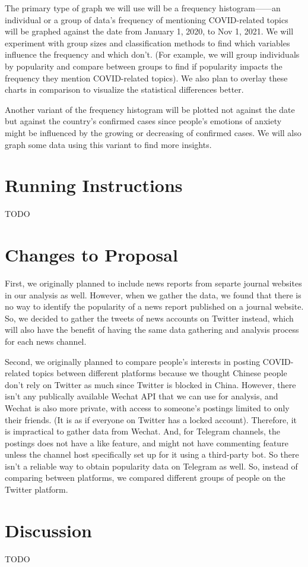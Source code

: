 \documentclass{article}
\begin{document}
    The primary type of graph we will use will be a frequency histogram——an individual or a group of data’s frequency of mentioning COVID-related topics will be graphed against the date from January 1, 2020, to Nov 1, 2021. We will experiment with group sizes and classification methods to find which variables influence the frequency and which don’t. (For example, we will group individuals by popularity and compare between groups to find if popularity impacts the frequency they mention COVID-related topics). We also plan to overlay these charts in comparison to visualize the statistical differences better.

    Another variant of the frequency histogram will be plotted not against the date but against the country’s confirmed cases since people’s emotions of anxiety might be influenced by the growing or decreasing of confirmed cases. We will also graph some data using this variant to find more insights.

    \section{Running Instructions}
    \indent

    TODO

    \section{Changes to Proposal}
    \indent

    First, we originally planned to include news reports from separte journal websites in our analysis as well. However, when we gather the data, we found that there is no way to identify the popularity of a news report published on a journal website. So, we decided to gather the tweets of news accounts on Twitter instead, which will also have the benefit of having the same data gathering and analysis process for each news channel.

    Second, we originally planned to compare people's interests in posting COVID-related topics between different platforms because we thought Chinese people don't rely on Twitter as much since Twitter is blocked in China. However, there isn't any publically available Wechat API that we can use for analysis, and Wechat is also more private, with access to someone's postings limited to only their friends. (It is as if everyone on Twitter has a locked account). Therefore, it is impractical to gather data from Wechat. And, for Telegram channels, the postings does not have a like feature, and might not have commenting feature unless the channel host specifically set up for it using a third-party bot. So there isn't a reliable way to obtain popularity data on Telegram as well. So, instead of comparing between platforms, we compared different groups of people on the Twitter platform.

    \section{Discussion}
    \indent

    TODO
\end{document}
